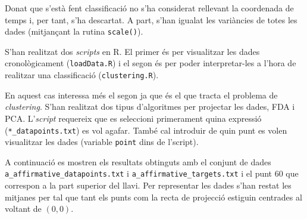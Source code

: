 \documentclass[a4paper]{article}
\begin{document}
 Donat que s'està fent classificació no s'ha considerat rellevant la coordenada de temps i, per tant, s'ha descartat. A part, s'han igualat les variàncies de totes les dades (mitjançant la rutina \verb|scale()|).

S'han realitzat dos \emph{scripts} en R. El primer és per visualitzar les dades cronològicament (\verb|loadData.R|) i el segon és per poder interpretar-les a l'hora de realitzar una classificació (\verb|clustering.R|).

En aquest cas interessa més el segon ja que és el que tracta el problema de \emph{clustering}. S'han realitzat dos tipus d'algoritmes\cite{bishop} per projectar les dades, FDA i PCA. L'\emph{script} requereix que es seleccioni primerament quina expressió (\verb|*_datapoints.txt|) es vol agafar. També cal introduir de quin punt es volen visualitzar les dades (variable \verb|point| dins de l'script). 

A continuació es mostren els resultats obtinguts amb el conjunt de dades \verb|a_affirmative_datapoints.txt| i \verb|a_affirmative_targets.txt| i el punt 60 que correspon a la part superior del llavi. Per representar les dades s'han restat les mitjanes per tal que tant els punts com la recta de projecció estiguin centrades al voltant de $(0,0)$.
\end{document}
